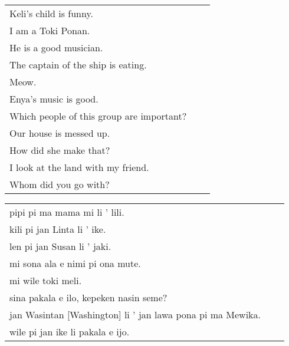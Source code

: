 \begin{supertabular}{p{5,5cm}|ll}
    Keli's child is funny.                    \\ %
    I am a Toki Ponan.                        \\  %
    He is a good musician.                    \\  %
    The captain of the ship is eating.        \\ %
    Meow.                                     \\ %
    Enya's music is good.                     \\ %
    Which people of this group are important? \\ %
    Our house is messed up.                   \\ %
    How did she make that?                    \\ %
    I look at the land with my friend. &  &   \\ %
    Whom did you go with?              &  &   \\  %
\end{supertabular}

\begin{supertabular}{p{5,5cm}|ll}
    pipi pi ma mama mi li ' lili.                              \\ %
    kili pi jan Linta li ' ike.                                \\ %
    len pi jan Susan li ' jaki.                                \\ %
    mi sona ala e nimi pi ona mute.                            \\ %
    mi wile toki meli.                                         \\ %
    sina pakala e ilo, kepeken nasin seme?                     \\ %
    jan Wasintan [Washington] li ' jan lawa pona pi ma Mewika. \\   %
    wile pi jan ike li pakala e ijo.                           \\ %
\end{supertabular}

